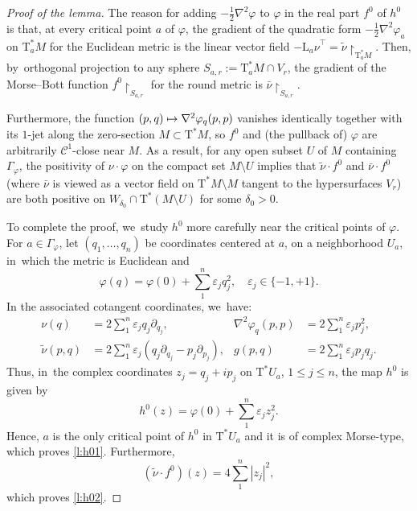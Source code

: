 \documentclass[10pt]{amsart}
\newcommand\mto{\mathchoice{\longmapsto}{\mapsto}{\mapsto}{\mapsto}}
\let\epsilon\varepsilon
\newcommand{\cC}{{\mathcal{C}}}
\newcommand{\Crit}{\Gamma_{\!\varphi}}
\newcommand{\etc}{,\ldots,}
\newcommand{\sT}{\mathrm{T}^\ast}
\newcommand{\hnu}{\tilde\nu}
\newcommand{\cnu}{\bar\nu}
\def\Lnu_#1{{\mathrm L_#1\nu}}
\newcommand{\de}{\mathrel{:=}}
\newcommand{\rst}[1]{{\upharpoonright}_{\!#1}}
\let\del\partial
\let\sgn\epsilon
\theoremstyle{plain}
\theoremstyle{definition}
\begin{document}
\begin{proof}[Proof of the lemma]
The reason for adding $-\frac12 \nabla^2\varphi$ to $\varphi$ in the real part
$f^0$ of $h^0$ is that, at every critical point $a$ of $\varphi$, the gradient
of the quadratic form $-\frac12 \nabla^2\varphi_a$ on $\sT_aM$ for the Euclidean
metric is the linear vector field $-\Lnu_a^\top = \hnu \rst{ \sT_aM }$. Then, by~orthogonal projection to any sphere $S_{a,r} \de \sT_aM \cap V_r$, the gradient
of the Morse--Bott function $f^0 \rst{ S_{a,r} }$ for the round metric is $\cnu
\rst{ S_{a,r} }$.

Furthermore, the function $(p,q) \mto \nabla^2\varphi_q (p,p)$ vanishes
identically together with its $1$-jet along the zero-section $M \subset \sT M$,
so $f^0$ and (the pullback of) $\varphi$ are arbitrarily $\cC^1$-close near $M$.
As a result, for any open subset $U$ of $M$ containing $\Crit$, the positivity
of $\nu \cdot \varphi$ on the compact set $M \setminus U$ implies that $\hnu \cdot f^0$
and $\cnu \cdot f^0$ (where $\cnu$ is viewed as a vector field on $\sT M \setminus M$
tangent to the hypersurfaces $V_r$) are both positive on $W_{\delta_0} \cap \sT
(M \setminus U)$ for some $\delta_0 > 0$.

To complete the proof, we~study $h^0$ more carefully near the critical points of
$\varphi$. For $a \in \Crit$, let $(q_1 \etc q_n)$ be coordinates centered at
$a$, on a neighborhood $U_a$, in~which the metric is Euclidean and
\[
\varphi(q) = \varphi(0) + \sum_1^n \sgn_j q_j^2, \quad
 \sgn_j \in \{-1,+1\}.
\]
In the associated cotangent coordinates, we~have:
\begin{align*}
 \nu(q) &= 2 \sum_1^n \sgn_j q_j \del_{q_j}, &
 \nabla^2\varphi_q(p,p) &= 2 \sum_1^n \sgn_j p_j^2, \\
 \hnu(p,q) &= 2 \sum_1^n \sgn_j (q_j \del_{q_j} - p_j \del_{p_j}), &
 g(p,q) &= 2 \sum_1^n \sgn_j p_jq_j.
\end{align*}
Thus, in~the complex coordinates $z_j = q_j+ip_j$ on $\sT U_a$, $1 \le j \le n$,
the map $h^0$ is given by
\[
h^0(z) = \varphi(0) + \sum_1^n \sgn_j z_j^2.
\]
Hence, $a$ is the only critical point of $h^0$ in $\sT U_a$ and it is of complex
Morse-type, which proves \eqref{l:h01}. Furthermore,
\[
(\hnu \cdot f^0)(z) = 4 \sum_1^n |z_j|^2,
\]
which proves \eqref{l:h02}.


\end{proof}
\end{document}
